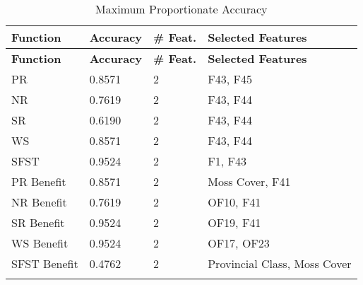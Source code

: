 \begin{longtable}{|p{3cm}|p{2cm}|p{2cm}|p{8cm}|}
\hline
\textbf{Function} & \textbf{Accuracy} & \textbf{\# Feat.} & \textbf{Selected Features} \\ \hline
\endfirsthead
\hline
\textbf{Function} & \textbf{Accuracy} & \textbf{\# Feat.} & \textbf{Selected Features} \\ \hline
\endhead

PR & 0.8571 & 2 & F43, F45 \\ \hline
NR & 0.7619 & 2 & F43, F44 \\ \hline
SR & 0.6190 & 2 & F43, F44 \\ \hline
WS & 0.8571 & 2 & F43, F44 \\ \hline
SFST & 0.9524 & 2 & F1, F43 \\ \hline
PR Benefit & 0.8571 & 2 & Moss Cover, F41 \\ \hline
NR Benefit & 0.7619 & 2 & OF10, F41 \\ \hline
SR Benefit & 0.9524 & 2 & OF19, F41 \\ \hline
WS Benefit & 0.9524 & 2 & OF17, OF23 \\ \hline
SFST Benefit & 0.4762 & 2 & Provincial Class, Moss Cover \\ \hline

\caption{Maximum Proportionate Accuracy}
\label{tab_class_specxtra:ensemble_prop_class_acc}
\end{longtable}
